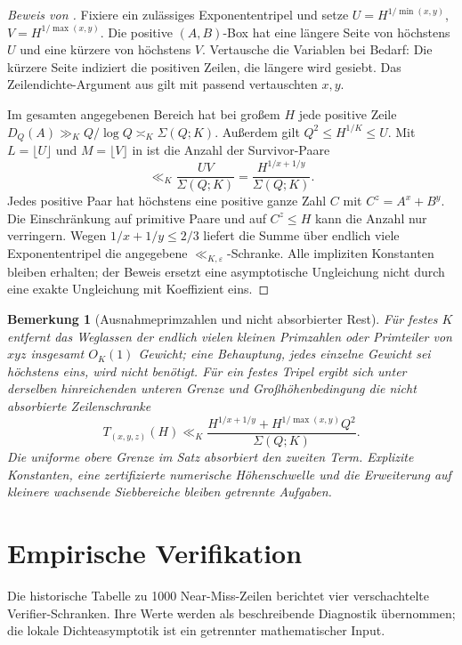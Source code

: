 \documentclass[11pt,a4paper]{article}
\newtheorem{remark}[theorem]{Bemerkung}
\begin{document}
\begin{proof}[Beweis von ]
Fixiere ein zulässiges Exponententripel und setze
$U=H^{1/\min(x,y)}$, $V=H^{1/\max(x,y)}$.
Die positive $(A,B)$-Box hat eine längere Seite von höchstens $U$
und eine kürzere von höchstens $V$. Vertausche die Variablen bei
Bedarf: Die kürzere Seite indiziert die positiven Zeilen, die längere
wird gesiebt. Das Zeilendichte-Argument aus
 gilt mit passend vertauschten $x,y$.

Im gesamten angegebenen Bereich hat bei großem $H$ jede positive
Zeile $D_Q(A)\gg_K Q/\log Q\asymp_K\Sigma(Q;K)$.
Außerdem gilt $Q^2\le H^{1/K}\le U$.
Mit $L=\lfloor U\rfloor$ und $M=\lfloor V\rfloor$ in
 ist die Anzahl der Survivor-Paare
\[
 \ll_K\frac{UV}{\Sigma(Q;K)}
       =\frac{H^{1/x+1/y}}{\Sigma(Q;K)}.
\]
Jedes positive Paar hat höchstens eine positive ganze Zahl $C$ mit
$C^z=A^x+B^y$. Die Einschränkung auf primitive Paare und auf
$C^z\le H$ kann die Anzahl nur verringern. Wegen $1/x+1/y\le2/3$
liefert die Summe über endlich viele Exponententripel die angegebene
$\ll_{K,\varepsilon}$-Schranke. Alle impliziten Konstanten bleiben
erhalten; der Beweis ersetzt eine asymptotische Ungleichung nicht
durch eine exakte Ungleichung mit Koeffizient eins.
\end{proof}

\begin{remark}[Ausnahmeprimzahlen und nicht absorbierter Rest]
\label{rem:exceptional}
Für festes $K$ entfernt das Weglassen der endlich vielen kleinen
Primzahlen oder Primteiler von $xyz$ insgesamt $O_K(1)$ Gewicht;
eine Behauptung, jedes einzelne Gewicht sei höchstens eins,
wird nicht benötigt. Für ein festes Tripel ergibt sich unter
derselben hinreichenden unteren Grenze und Großhöhenbedingung
die nicht absorbierte Zeilenschranke
\[
 T_{(x,y,z)}(H)\ll_K
 \frac{H^{1/x+1/y}+H^{1/\max(x,y)}Q^2}{\Sigma(Q;K)}.
\]
Die uniforme obere Grenze im Satz absorbiert den zweiten Term.
Explizite Konstanten, eine zertifizierte numerische Höhenschwelle und
die Erweiterung auf kleinere wachsende Siebbereiche bleiben getrennte
Aufgaben.
\end{remark}

\section{Empirische Verifikation}
\label{sec:empirical}

Die historische Tabelle zu 1000 Near-Miss-Zeilen berichtet vier
verschachtelte Verifier-Schranken. Ihre Werte werden als beschreibende
Diagnostik übernommen; die lokale Dichteasymptotik ist ein getrennter
mathematischer Input.
\end{document}
